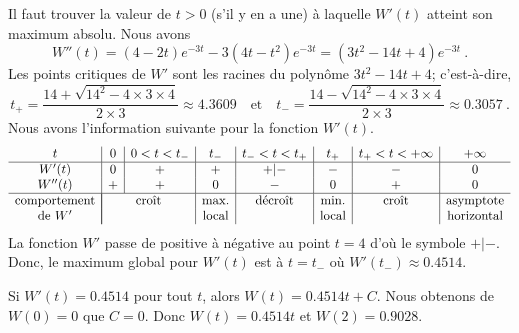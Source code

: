{ Il faut trouver la valeur de $t>0$ (s'il y en a une) à
laquelle $W'(t)$ atteint son maximum absolu.  Nous avons
\[
W''(t) = (4-2t) e^{-3t} - 3 (4t-t^2) e^{-3t}
= (3t^2 - 14 t + 4) e^{-3t} \ .
\]
Les points critiques de $W'$ sont les racines du polynôme
$3t^2 - 14 t + 4$; c'est-à-dire,
\[
t_+ = \frac{14 + \sqrt{14^2-4\times 3\times 4}}{2\times 3}
\approx 4.3609
\quad \text{et} \quad
t_- = \frac{14 - \sqrt{14^2-4\times 3\times 4}}{2\times 3}
\approx 0.3057 \ .
\]
Nous avons l'information suivante pour la fonction $W'(t)$.
\[
\begin{array}{c|c|c|c|c|c|c|c}
t & 0 & 0<t < t_- & t_- & t_- < t < t_+ & t_+& t_+ < t < +\infty & +\infty \\
\hline
W'(t) & 0 & + & + & +|- & - & - & 0 \\
W''(t) & + & + & 0 & - & 0 & + & 0 \\
\hline
\text{comportement} & \multicolumn{2}{|c|}{\text{croît}} & \text{max.} &
\text{décroît} & \text{min.} & \text{croît} & \text{asymptote} \\
\text{de } W' & \multicolumn{2}{|c|}{} & \text{local} & & \text{local}
& & \text{horizontal}
\end{array}
\]
La fonction $W'$ passe de positive à négative au point $t=4$ d'où le
symbole $+|-$.  Donc, le maximum global pour $W'(t)$ est à $t= t_-$ où
$W'(t_-) \approx 0.4514$.

 Si $W'(t) = 0.4514$ pour tout $t$, alors $W(t) = 0.4514 t +
C$.  Nous obtenons de $W(0)=0$ que $C = 0$.  Donc $W(t) = 0.4514 t$ et 
$W(2) = 0.9028$.
}

